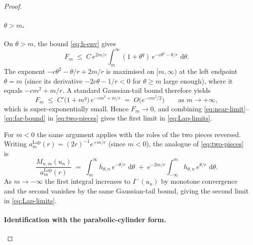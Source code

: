 \documentclass[12pt, a4paper]{report}
\newcommand{\dd}{\,\mathrm{d}}
\newcommand{\Lap}{\mathrm{Lap}}
\newcommand{\1}{\mathbf{1}}
\begin{document}
\begin{proof}
\begin{enumerate}
\paragraph{$\theta > m$.} \quad
On $\theta > m$, the bound \eqref{eq:h-env} gives
\[
  F_m \;\leq\; C\,e^{2m/r}\!\int_m^\infty (1+\theta^q)\,
  e^{-c\theta^2-\theta/r}\,\dd\theta.
\]
The exponent $-c\theta^2-\theta/r+2m/r$ is maximised on $[m,\infty)$ at
the left endpoint $\theta = m$ (since its derivative
$-2c\theta - 1/r < 0$ for $\theta\geq m$ large enough), where it equals
$-cm^2+m/r$. A standard Gaussian-tail bound therefore yields
\begin{equation}\label{eq:far-bound}
  F_m \;\leq\; C'\bigl(1+m^q\bigr)\,e^{-cm^2+m/r}
  \;=\; O\!\bigl(e^{-cm^2/2}\bigr)
  \qquad\text{as }m\to+\infty,
\end{equation}
which is super-exponentially small. Hence $F_m\to 0$, and combining
\eqref{eq:near-limit}--\eqref{eq:far-bound} in \eqref{eq:two-pieces}
gives the first limit in \eqref{eq:Lap-limits}.

For $m<0$ the same argument applies with the roles of the two pieces reversed. Writing $a_m^{\Lap}(r) = (2r)^{-1}e^{+m/r}$ (since $m<0$),
the analogue of \eqref{eq:two-pieces} is
\[
  \frac{M_{n,m}(u_n)}{a_m^{\Lap}(r)}
  \;=\;\int_m^\infty h_{\theta,n}\,e^{-\theta/r}\,\dd\theta
  \;+\;e^{-2m/r}\int_{-\infty}^m h_{\theta,n}\,e^{\theta/r}\,\dd\theta.
\]
As $m\to-\infty$ the first integral increases to $I^-(u_n)$ by monotone
convergence and the second vanishes by the same Gaussian-tail bound,
giving the second limit in \eqref{eq:Lap-limits}.

\paragraph{Identification with the parabolic-cylinder form.} 


\end{enumerate}
\end{proof}
\end{document}
